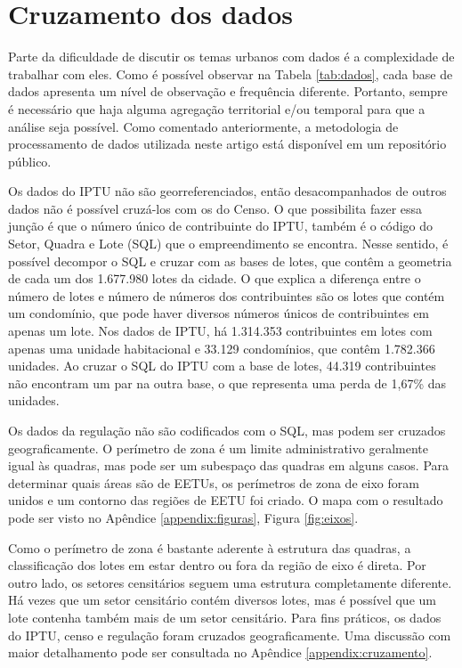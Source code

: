 \clearpage
\section{Cruzamento dos dados}
\label{sec:dadosCruz}

Parte da dificuldade de discutir os temas urbanos com dados é a complexidade de trabalhar com eles. Como é possível observar na Tabela \ref{tab:dados}, cada base de dados apresenta um nível de observação e frequência diferente. Portanto, sempre é necessário que haja alguma agregação territorial e/ou temporal para que a análise seja possível. Como comentado anteriormente, a metodologia de processamento de dados utilizada neste artigo está disponível em um repositório público.



Os dados do IPTU não são georreferenciados, então desacompanhados de outros dados não é possível cruzá-los com os do Censo. O que possibilita fazer essa junção é que o número único de contribuinte do IPTU, também é o código do Setor, Quadra e Lote (SQL) que o empreendimento se encontra. Nesse sentido, é possível decompor o SQL e cruzar com as bases de lotes, que contêm a geometria de cada  um dos 1.677.980 lotes da cidade. O que explica a diferença entre o número de lotes e número de números dos contribuintes são os lotes que contém um condomínio, que pode haver diversos números únicos de contribuintes em apenas um lote. Nos dados de IPTU, há 1.314.353 contribuintes em lotes com apenas uma unidade habitacional e 33.129 condomínios, que contêm 1.782.366 unidades. Ao cruzar o SQL do IPTU com a base de lotes, 44.319 contribuintes não encontram um par na outra base, o que representa uma perda de 1,67\% das unidades. 

Os dados da regulação não são codificados com o SQL, mas podem ser cruzados geograficamente. O perímetro de zona é um limite administrativo geralmente igual às quadras, mas pode ser um subespaço das quadras em alguns casos. Para determinar quais áreas são de EETUs, os perímetros de zona de eixo foram unidos e um contorno das regiões de EETU foi criado. O mapa com o resultado pode ser visto no Apêndice \ref{appendix:figuras}, Figura \ref{fig:eixos}. 

Como o perímetro de zona é bastante aderente à estrutura das quadras, a classificação dos lotes em estar dentro ou fora da região de eixo é direta. Por outro lado, os setores censitários seguem uma estrutura completamente diferente. Há vezes que um setor censitário contém diversos lotes, mas é possível que um lote contenha também mais de um setor censitário. Para fins práticos, os dados do IPTU, censo e regulação foram cruzados geograficamente. Uma discussão com maior detalhamento pode ser consultada no Apêndice \ref{appendix:cruzamento}.

